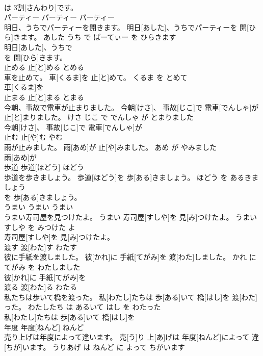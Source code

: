 \documentclass[8pt]{extreport}
\begin{document}
\begin{CJK}{UTF8}{min}
\\	は 3割[さんわり]です。		
\\	パーティー	パーティー	パーティー	
\\	明日、うちでパーティーを開きます。	明日[あした]、うちでパーティーを 開[ひら]きます。	あした うち で ぱーてぃー を ひらきます	
\\	明日[あした]、うちで
\\	を 開[ひら]きます。		
\\	止める	止[と]める	とめる	
\\	車を止めて。	車[くるま]を 止[と]めて。	くるま を とめて	
\\	車[くるま]を
\\	止まる	止[と]まる	とまる	
\\	今朝、事故で電車が止まりました。	今朝[けさ]、 事故[じこ]で 電車[でんしゃ]が 止[と]まりました。	けさ じこ で でんしゃ が とまりました	
\\	今朝[けさ]、 事故[じこ]で 電車[でんしゃ]が
\\	止む	止[や]む	やむ	
\\	雨が止みました。	雨[あめ]が 止[や]みました。	あめ が やみました	
\\	雨[あめ]が
\\	歩道	歩道[ほどう]	ほどう	
\\	歩道を歩きましょう。	歩道[ほどう]を 歩[ある]きましょう。	ほどう を あるきましょう	
\\	を 歩[ある]きましょう。		
\\	うまい	うまい	うまい	
\\	うまい寿司屋を見つけたよ。	うまい 寿司屋[すしや]を 見[み]つけたよ。	うまい すしや を みつけた よ	
\\	寿司屋[すしや]を 見[み]つけたよ。		
\\	渡す	渡[わた]す	わたす	
\\	彼に手紙を渡しました。	彼[かれ]に 手紙[てがみ]を 渡[わた]しました。	かれ に てがみ を わたしました	
\\	彼[かれ]に 手紙[てがみ]を
\\	渡る	渡[わた]る	わたる	
\\	私たちは歩いて橋を渡った。	私[わたし]たちは 歩[ある]いて 橋[はし]を 渡[わた]った。	わたしたち は あるいて はし を わたった	
\\	私[わたし]たちは 歩[ある]いて 橋[はし]を
\\	年度	年度[ねんど]	ねんど	
\\	売り上げは年度によって違います。	売[う]り 上[あ]げは 年度[ねんど]によって 違[ちが]います。	うりあげ は ねんど に よって ちがいます	

\end{CJK}
\end{document}
